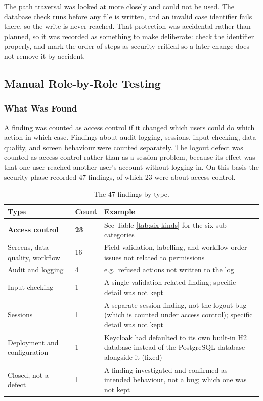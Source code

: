 The path traversal was looked at more closely and could not be used. The database check runs before any file is written, and an invalid case identifier fails there, so the write is never reached. That protection was accidental rather than planned, so it was recorded as something to make deliberate: check the identifier properly, and mark the order of steps as security-critical so a later change does not remove it by accident.

\subsection{Manual Role-by-Role Testing}
\label{sec:result-manual}

\subsubsection{What Was Found}

A finding was counted as access control if it changed which users could do which action in which case. Findings about audit logging, sessions, input checking, data quality, and screen behaviour were counted separately. The logout defect was counted as access control rather than as a session problem, because its effect was that one user reached another user's account without logging in. On this basis the security phase recorded 47 findings, of which 23 were about access control.

\begin{table}[H]
\centering
\caption{The 47 findings by type.}
\label{tab:findings-by-type}
\begin{tabular}{|p{4.2cm}|p{1.4cm}|p{8.3cm}|}
\hline
\textbf{Type} & \textbf{Count} & \textbf{Example} \\
\hline
\textbf{Access control} & \textbf{23} & See Table \ref{tab:six-kinds} for the six sub-categories \\
\hline
Screens, data quality, workflow & 16 & Field validation, labelling, and workflow-order issues not related to permissions \\
\hline
Audit and logging & 4 & e.g.\ refused actions not written to the log \\
\hline
Input checking & 1 & A single validation-related finding; specific detail was not kept \\
\hline
Sessions & 1 & A separate session finding, not the logout bug (which is counted under access control); specific detail was not kept \\
\hline
Deployment and configuration & 1 & Keycloak had defaulted to its own built-in H2 database instead of the PostgreSQL database alongside it (fixed) \\
\hline
Closed, not a defect & 1 & A finding investigated and confirmed as intended behaviour, not a bug; which one was not kept \\
\hline
\end{tabular}
\end{table}

